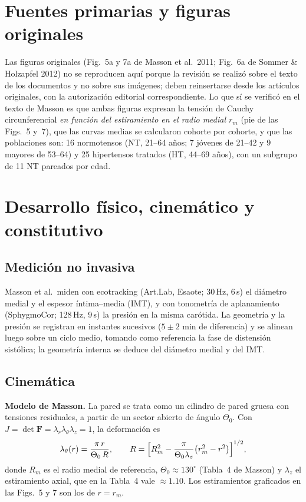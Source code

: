 \documentclass[11pt]{article}
\begin{document}
\section{Fuentes primarias y figuras originales}
Las figuras originales (Fig.~5a y 7a de Masson et al.\ 2011; Fig.~6a de Sommer \& Holzapfel 2012) no se reproducen aquí porque la revisión se realizó sobre el texto de los documentos y no sobre sus imágenes; deben reinsertarse desde los artículos originales, con la autorización editorial correspondiente. Lo que sí se verificó en el texto de Masson es que ambas figuras expresan la tensión de Cauchy circunferencial \emph{en función del estiramiento en el radio medial $r_m$} (pie de las Figs.~5 y~7), que las curvas medias se calcularon cohorte por cohorte, y que las poblaciones son: 16 normotensos (NT, 21--64 años; 7 jóvenes de 21--42 y 9 mayores de 53--64) y 25 hipertensos tratados (HT, 44--69 años), con un subgrupo de 11 NT pareados por edad.

\section{Desarrollo físico, cinemático y constitutivo}
\subsection{Medición no invasiva}
Masson et al.\ miden con ecotracking (Art.Lab, Esaote; 30\,Hz, 6\,s) el diámetro medial y el espesor íntima--media (IMT), y con tonometría de aplanamiento (SphygmoCor; 128\,Hz, 9\,s) la presión en la misma carótida. La geometría y la presión se registran en instantes sucesivos ($5\pm2$ min de diferencia) y se alinean luego sobre un ciclo medio, tomando como referencia la fase de distensión sistólica; la geometría interna se deduce del diámetro medial y del IMT.

\subsection{Cinemática}\label{sec:cin}
\textbf{Modelo de Masson.} La pared se trata como un cilindro de pared gruesa con tensiones residuales, a partir de un sector abierto de ángulo $\Theta_0$. Con $J=\det\bm F=\lambda_r\lambda_\theta\lambda_z=1$, la deformación es
\begin{equation}
\lambda_\theta(r)=\frac{\pi\,r}{\Theta_0\,R},\qquad
R=\Bigl[R_m^2-\frac{\pi}{\Theta_0\lambda_z}\bigl(r_m^2-r^2\bigr)\Bigr]^{1/2},
\label{eq:masson}
\end{equation}
donde $R_m$ es el radio medial de referencia, $\Theta_0\approx130^\circ$ (Tabla~4 de Masson) y $\lambda_z$ el estiramiento axial, que en la Tabla~4 vale $\approx1.10$. Los estiramientos graficados en las Figs.~5 y 7 son los de $r=r_m$.
\end{document}
